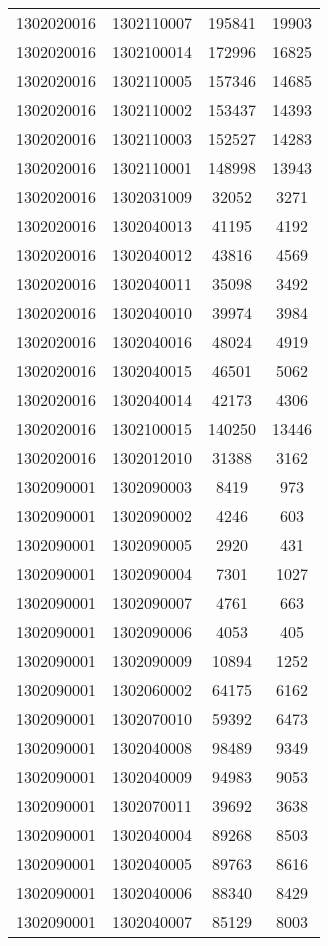 \begin{longtable}[h]{llcc}
		1302020016 & 1302110007 & 195841 & 19903\\
		1302020016 & 1302100014 & 172996 & 16825\\
		1302020016 & 1302110005 & 157346 & 14685\\
		1302020016 & 1302110002 & 153437 & 14393\\
		1302020016 & 1302110003 & 152527 & 14283\\
		1302020016 & 1302110001 & 148998 & 13943\\
		1302020016 & 1302031009 & 32052 & 3271\\
		1302020016 & 1302040013 & 41195 & 4192\\
		1302020016 & 1302040012 & 43816 & 4569\\
		1302020016 & 1302040011 & 35098 & 3492\\
		1302020016 & 1302040010 & 39974 & 3984\\
		1302020016 & 1302040016 & 48024 & 4919\\
		1302020016 & 1302040015 & 46501 & 5062\\
		1302020016 & 1302040014 & 42173 & 4306\\
		1302020016 & 1302100015 & 140250 & 13446\\
		1302020016 & 1302012010 & 31388 & 3162\\
		1302090001 & 1302090003 & 8419 & 973\\
		1302090001 & 1302090002 & 4246 & 603\\
		1302090001 & 1302090005 & 2920 & 431\\
		1302090001 & 1302090004 & 7301 & 1027\\
		1302090001 & 1302090007 & 4761 & 663\\
		1302090001 & 1302090006 & 4053 & 405\\
		1302090001 & 1302090009 & 10894 & 1252\\
		1302090001 & 1302060002 & 64175 & 6162\\
		1302090001 & 1302070010 & 59392 & 6473\\
		1302090001 & 1302040008 & 98489 & 9349\\
		1302090001 & 1302040009 & 94983 & 9053\\
		1302090001 & 1302070011 & 39692 & 3638\\
		1302090001 & 1302040004 & 89268 & 8503\\
		1302090001 & 1302040005 & 89763 & 8616\\
		1302090001 & 1302040006 & 88340 & 8429\\
		1302090001 & 1302040007 & 85129 & 8003\\

\end{longtable}
